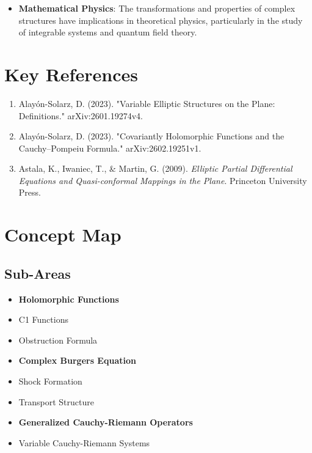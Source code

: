 \documentclass[11pt,a4paper]{article}
\begin{document}
\begin{itemize}
\item \textbf{Mathematical Physics}: The transformations and properties of complex structures have implications in theoretical physics, particularly in the study of integrable systems and quantum field theory.
\end{itemize}

\section{Key References}

\begin{enumerate}
\item Alayón-Solarz, D. (2023). "Variable Elliptic Structures on the Plane: Definitions." arXiv:2601.19274v4.
\item Alayón-Solarz, D. (2023). "Covariantly Holomorphic Functions and the Cauchy--Pompeiu Formula." arXiv:2602.19251v1.
\item Astala, K., Iwaniec, T., & Martin, G. (2009). \textit{Elliptic Partial Differential Equations and Quasi-conformal Mappings in the Plane}. Princeton University Press.
\end{enumerate}

\section{Concept Map}

\subsection{Sub-Areas}

\begin{itemize}
\item \textbf{Holomorphic Functions}
\item C1 Functions
\item Obstruction Formula
\end{itemize}

\begin{itemize}
\item \textbf{Complex Burgers Equation}
\item Shock Formation
\item Transport Structure
\end{itemize}

\begin{itemize}
\item \textbf{Generalized Cauchy-Riemann Operators}
\item Variable Cauchy-Riemann Systems
\end{itemize}
\end{document}

